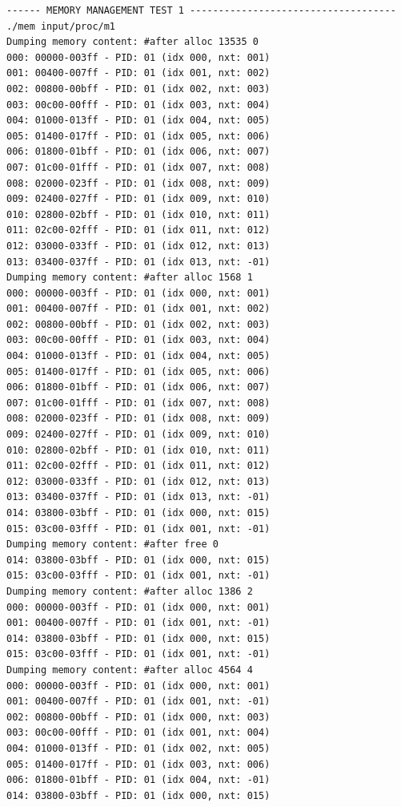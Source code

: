\documentclass[a4paper]{article}
\numberwithin{equation}{section}
\begin{document}
\begin{mdframed}[leftline=false,rightline=false,backgroundcolor=teal!10,nobreak=false]
  \begin{verbatim}
------ MEMORY MANAGEMENT TEST 1 ------------------------------------
./mem input/proc/m1
Dumping memory content: #after alloc 13535 0
000: 00000-003ff - PID: 01 (idx 000, nxt: 001)
001: 00400-007ff - PID: 01 (idx 001, nxt: 002)
002: 00800-00bff - PID: 01 (idx 002, nxt: 003)
003: 00c00-00fff - PID: 01 (idx 003, nxt: 004)
004: 01000-013ff - PID: 01 (idx 004, nxt: 005)
005: 01400-017ff - PID: 01 (idx 005, nxt: 006)
006: 01800-01bff - PID: 01 (idx 006, nxt: 007)
007: 01c00-01fff - PID: 01 (idx 007, nxt: 008)
008: 02000-023ff - PID: 01 (idx 008, nxt: 009)
009: 02400-027ff - PID: 01 (idx 009, nxt: 010)
010: 02800-02bff - PID: 01 (idx 010, nxt: 011)
011: 02c00-02fff - PID: 01 (idx 011, nxt: 012)
012: 03000-033ff - PID: 01 (idx 012, nxt: 013)
013: 03400-037ff - PID: 01 (idx 013, nxt: -01)
Dumping memory content: #after alloc 1568 1
000: 00000-003ff - PID: 01 (idx 000, nxt: 001)
001: 00400-007ff - PID: 01 (idx 001, nxt: 002)
002: 00800-00bff - PID: 01 (idx 002, nxt: 003)
003: 00c00-00fff - PID: 01 (idx 003, nxt: 004)
004: 01000-013ff - PID: 01 (idx 004, nxt: 005)
005: 01400-017ff - PID: 01 (idx 005, nxt: 006)
006: 01800-01bff - PID: 01 (idx 006, nxt: 007)
007: 01c00-01fff - PID: 01 (idx 007, nxt: 008)
008: 02000-023ff - PID: 01 (idx 008, nxt: 009)
009: 02400-027ff - PID: 01 (idx 009, nxt: 010)
010: 02800-02bff - PID: 01 (idx 010, nxt: 011)
011: 02c00-02fff - PID: 01 (idx 011, nxt: 012)
012: 03000-033ff - PID: 01 (idx 012, nxt: 013)
013: 03400-037ff - PID: 01 (idx 013, nxt: -01)
014: 03800-03bff - PID: 01 (idx 000, nxt: 015)
015: 03c00-03fff - PID: 01 (idx 001, nxt: -01)
Dumping memory content: #after free 0
014: 03800-03bff - PID: 01 (idx 000, nxt: 015)
015: 03c00-03fff - PID: 01 (idx 001, nxt: -01)
Dumping memory content: #after alloc 1386 2
000: 00000-003ff - PID: 01 (idx 000, nxt: 001)
001: 00400-007ff - PID: 01 (idx 001, nxt: -01)
014: 03800-03bff - PID: 01 (idx 000, nxt: 015)
015: 03c00-03fff - PID: 01 (idx 001, nxt: -01)
Dumping memory content: #after alloc 4564 4
000: 00000-003ff - PID: 01 (idx 000, nxt: 001)
001: 00400-007ff - PID: 01 (idx 001, nxt: -01)
002: 00800-00bff - PID: 01 (idx 000, nxt: 003)
003: 00c00-00fff - PID: 01 (idx 001, nxt: 004)
004: 01000-013ff - PID: 01 (idx 002, nxt: 005)
005: 01400-017ff - PID: 01 (idx 003, nxt: 006)
006: 01800-01bff - PID: 01 (idx 004, nxt: -01)
014: 03800-03bff - PID: 01 (idx 000, nxt: 015)

\end{verbatim}
\end{mdframed}
\end{document}

